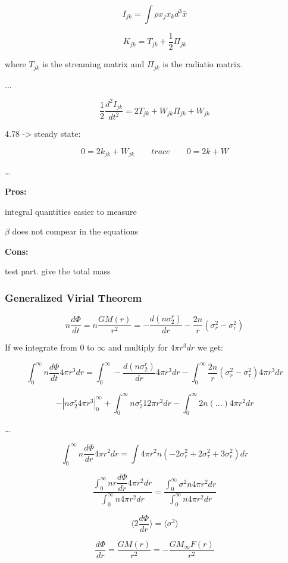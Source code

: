 $$
I_{jk} = \int \rho x_j x_k d^3 \bar x
$$

$$
K_{jk} = T_{jk} + \dfrac 12 \Pi_{jk}
$$

where $T_{jk}$ is the streaming matrix and $\Pi_{jk}$ is the radiatio matrix.

...

$$
\dfrac 12 \dfrac {d^2 I_{jk}}{dt^2} = 2 T_{jk} + W_{jk} \Pi_{jk} + W_{jk} 
$$

4.78 -> steady state:

$$
0 = 2k_{jk} + W_{jk} \qquad trace \qquad 0 = 2k + W
$$

\dots

\textbf{Pros:}

integral quantities easier to measure

$\beta$ does not compear in the equations

\textbf{Cons:}

test part. give the total mass

\subsubsection{Generalized Virial Theorem}

$$
n \dfrac {d \Phi}{dt} = n \dfrac {GM(r)}{r^2} = - \dfrac {d(n \sigma^r_2)}{dr} - \dfrac{2n}{r} (\sigma_r^2 - \sigma_{\tau}^2) 
$$

If we integrate from $0$ to $\infty$ and multiply for $4 \pi r^3 dr$ we get:

$$
\int_0^\infty n \dfrac {d \Phi}{dt} 4 \pi r^3 dr = \int_0^\infty - \dfrac {d(n \sigma^r_2)}{dr} 4 \pi r^3 dr - \int_0^\infty \dfrac{2n}{r} (\sigma_r^2 - \sigma_{\tau}^2) 4 \pi r^3 dr
$$

$$
- |n \sigma^r_2 4 \pi r^3|_{0}^\infty + \int_0^\infty n \sigma^r_2 12 \pi r^2 dr - \int_0^\infty 2 n ( ... ) 4 \pi r^2 dr
$$

\dots

$$
\int_0^\infty n \dfrac {d \Phi}{dr} 4 \pi r^2 dr = \int 4 \pi r^2 n (- 2 \sigma_r^2 + 2 \sigma _{\tau}^2 + 3 \sigma_r^2)dr
$$

$$
\dfrac{\int_0^\infty n r \dfrac {d \Phi}{dr} 4 \pi r^2 dr}{\int_0^\infty n 4 \pi r^2 dr} = \dfrac {\int_0^\infty \sigma^2 n 4 \pi r^2 dr}{\int_0^\infty n 4 \pi r^2 dr}
$$

$$
\langle 2 \dfrac {d \Phi}{dr} \rangle = \langle \sigma^2 \rangle
$$

$$
\dfrac{d \Phi}{dr} = \dfrac{GM(r)}{r^2} = - \dfrac {G M_{\infty} F(r)}{r^2}  
$$

